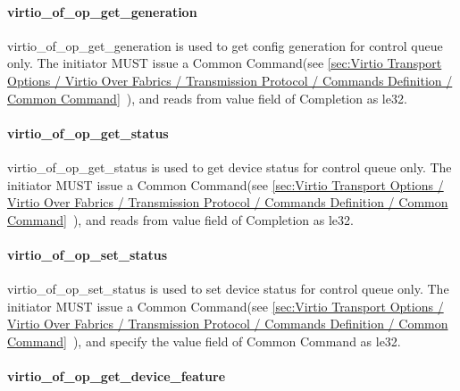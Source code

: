 \paragraph{virtio_of_op_get_generation}\label{sec:Virtio Transport Options / Virtio Over Fabrics / Transmission Protocol / Opcodes Definition / virtio_of_op_get_generation}

virtio_of_op_get_generation is used to get config generation for control queue only. The initiator MUST issue a Common Command(see \ref{sec:Virtio Transport Options / Virtio Over Fabrics / Transmission Protocol / Commands Definition / Common Command}~), and reads from value field of Completion as le32.

\paragraph{virtio_of_op_get_status}\label{sec:Virtio Transport Options / Virtio Over Fabrics / Transmission Protocol / Opcodes Definition / virtio_of_op_get_status}

virtio_of_op_get_status is used to get device status for control queue only. The initiator MUST issue a Common Command(see \ref{sec:Virtio Transport Options / Virtio Over Fabrics / Transmission Protocol / Commands Definition / Common Command}~), and reads from value field of Completion as le32.

\paragraph{virtio_of_op_set_status}\label{sec:Virtio Transport Options / Virtio Over Fabrics / Transmission Protocol / Opcodes Definition / virtio_of_op_set_status}

virtio_of_op_set_status is used to set device status for control queue only. The initiator MUST issue a Common Command(see \ref{sec:Virtio Transport Options / Virtio Over Fabrics / Transmission Protocol / Commands Definition / Common Command}~), and specify the value field of Common Command as le32.

\paragraph{virtio_of_op_get_device_feature}\label{sec:Virtio Transport Options / Virtio Over Fabrics / Transmission Protocol / Opcodes Definition / virtio_of_op_get_device_feature}

